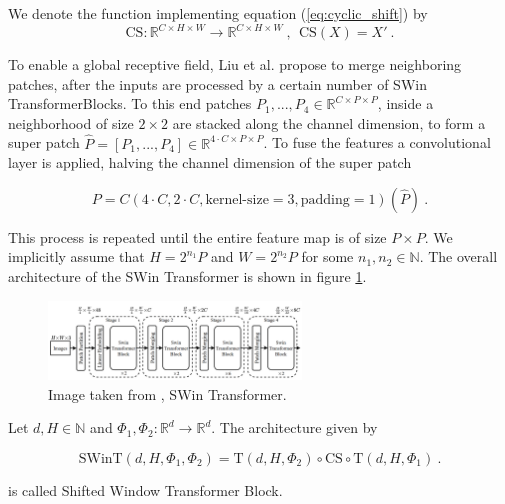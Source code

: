 \begin{definition}
    \label{def:partitioning}
    We denote the function implementing equation (\ref{eq:cyclic_shift}) by
    \begin{equation*}
        \text{CS}: \mathbb R^{C \times H \times W} \to \mathbb R^{C \times H \times W} ~, ~~
        \text{CS}(X) = X' ~.
    \end{equation*}
\end{definition}

To enable a global receptive field, 
Liu et al. \cite{liuSwinTransformerHierarchical2021} propose to merge neighboring patches, 
after the inputs are processed by a certain number of SWin TransformerBlocks.
To this end patches $P_1, ..., P_4 \in \mathbb R^{C \times P \times P}$,
inside a neighborhood of size $2 \times 2$ are stacked along the channel dimension,
to form a super patch $\hat{P} = [P_1, ..., P_4] \in \mathbb R^{4 \cdot C \times P \times P}$.
To fuse the features a convolutional layer is applied, 
halving the channel dimension of the super patch

    \begin{equation*}
        P = C(4 \cdot C, 2 \cdot C, \text{kernel-size}=3, \text{padding}=1)(\hat{P}) ~.
    \end{equation*}

This process is repeated until the entire feature map is of size $P \times P$.
We implicitly assume that $H = 2^{n_1} P$ and $W = 2^{n_2} P$ for some $n_1, n_2 \in \mathbb N$.
The overall architecture of the SWin Transformer is shown in figure \ref{fig:swin}.

\begin{figure}[h!]
    \begin{center}
        \includegraphics[width=0.6\textwidth]{models/preliminaries/imgs/swin.png}
    \end{center}
    \caption{Image taken from \cite{liuSwinTransformerHierarchical2021}, SWin Transformer.}
    \label{fig:swin}
\end{figure}

\begin{definition}
    Let $d, H \in \mathbb N$ and $\Phi_1, \Phi_2: \mathbb R^d \to \mathbb R^{d}$.
    The architecture given by

        \begin{equation*}
            \text{SWinT}(d, H, \Phi_1, \Phi_2) = \text{T}(d, H, \Phi_2) \circ \text{CS}\circ \text{T}(d, H, \Phi_1) ~.
        \end{equation*}

    is called Shifted Window Transformer Block.
\end{definition}

